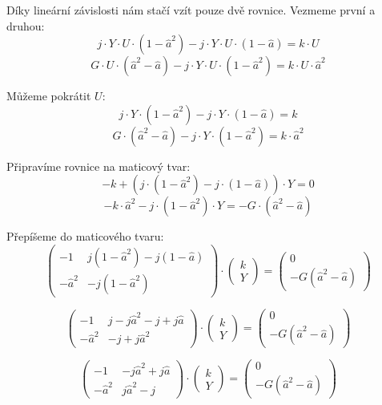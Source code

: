 \documentclass{article}
\begin{document}
Díky lineární závislosti nám stačí vzít pouze dvě rovnice. Vezmeme první a druhou:
$$
    j \cdot Y \cdot U \cdot (1 - \hat{a}^2) - j \cdot Y \cdot U \cdot (1 - \hat{a}) = k \cdot U
$$
$$
    G \cdot U \cdot (\hat{a}^2 - \hat{a}) - j \cdot Y \cdot U \cdot (1 - \hat{a}^2) = k \cdot U \cdot \hat{a}^2
$$

Můžeme pokrátit $U$:
$$
    j \cdot Y \cdot (1 - \hat{a}^2) - j \cdot Y \cdot (1 - \hat{a}) = k
$$
$$
    G \cdot (\hat{a}^2 - \hat{a}) - j \cdot Y \cdot (1 - \hat{a}^2) = k \cdot \hat{a}^2
$$

Připravíme rovnice na maticový tvar:
$$
    -k + \left( j \cdot (1 - \hat{a}^2) - j \cdot (1 - \hat{a}) \right) \cdot Y = 0
$$
$$
    -k \cdot \hat{a}^2 - j \cdot (1 - \hat{a}^2) \cdot Y = -G \cdot (\hat{a}^2 - \hat{a})
$$

Přepíšeme do maticového tvaru:
$$
    \begin{pmatrix}
        -1         & j (1 - \hat{a}^2) - j (1 - \hat{a}) \\
        -\hat{a}^2 & - j (1 - \hat{a}^2)
    \end{pmatrix}
    \cdot
    \begin{pmatrix}
        k \\
        Y
    \end{pmatrix}
    =
    \begin{pmatrix}
        0 \\
        -G (\hat{a}^2 - \hat{a})
    \end{pmatrix}
$$

$$
    \begin{pmatrix}
        -1         & j - j \hat{a}^2 - j + j \hat{a} \\
        -\hat{a}^2 & - j + j \hat{a}^2
    \end{pmatrix}
    \cdot
    \begin{pmatrix}
        k \\
        Y
    \end{pmatrix}
    =
    \begin{pmatrix}
        0 \\
        - G (\hat{a}^2 - \hat{a})
    \end{pmatrix}
$$

$$
    \begin{pmatrix}
        -1         & - j \hat{a}^2 + j \hat{a} \\
        -\hat{a}^2 & j \hat{a}^2 - j
    \end{pmatrix}
    \cdot
    \begin{pmatrix}
        k \\
        Y
    \end{pmatrix}
    =
    \begin{pmatrix}
        0 \\
        - G (\hat{a}^2 - \hat{a})
    \end{pmatrix}
$$
\end{document}
